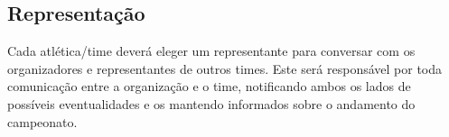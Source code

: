 \subsection{Representação}

Cada atlética/time deverá eleger um representante para conversar com os organizadores e representantes de outros times. Este será responsável por toda comunicação entre a organização e o time, notificando ambos os lados de possíveis eventualidades e os mantendo informados sobre o andamento do campeonato.
